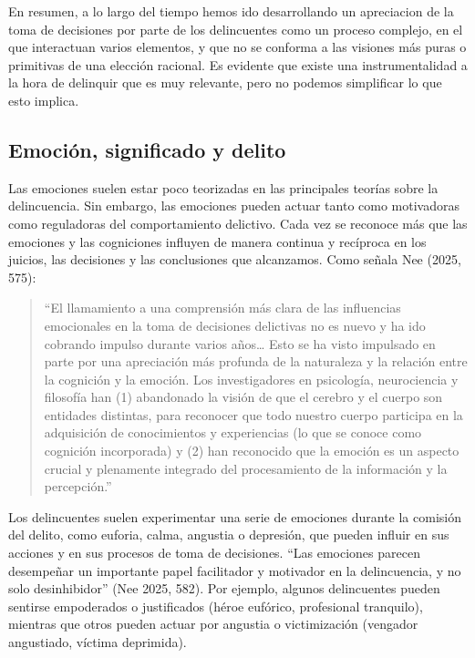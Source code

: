 \documentclass[
  spanish,
  letterpaper,
  DIV=11,
  numbers=noendperiod]{scrreprt}
\begin{document}
En resumen, a lo largo del tiempo hemos ido desarrollando un apreciacion
de la toma de decisiones por parte de los delincuentes como un proceso
complejo, en el que interactuan varios elementos, y que no se conforma a
las visiones más puras o primitivas de una elección racional. Es
evidente que existe una instrumentalidad a la hora de delinquir que es
muy relevante, pero no podemos simplificar lo que esto implica.

\subsection{Emoción, significado y
delito}\label{emociuxf3n-significado-y-delito}

Las emociones suelen estar poco teorizadas en las principales teorías
sobre la delincuencia. Sin embargo, las emociones pueden actuar tanto
como motivadoras como reguladoras del comportamiento delictivo. Cada vez
se reconoce más que las emociones y las cogniciones influyen de manera
continua y recíproca en los juicios, las decisiones y las conclusiones
que alcanzamos. Como señala Nee (2025, 575):

\begin{quote}
``El llamamiento a una comprensión más clara de las influencias
emocionales en la toma de decisiones delictivas no es nuevo y ha ido
cobrando impulso durante varios años\ldots{} Esto se ha visto impulsado
en parte por una apreciación más profunda de la naturaleza y la relación
entre la cognición y la emoción. Los investigadores en psicología,
neurociencia y filosofía han (1) abandonado la visión de que el cerebro
y el cuerpo son entidades distintas, para reconocer que todo nuestro
cuerpo participa en la adquisición de conocimientos y experiencias (lo
que se conoce como cognición incorporada) y (2) han reconocido que la
emoción es un aspecto crucial y plenamente integrado del procesamiento
de la información y la percepción.''
\end{quote}

Los delincuentes suelen experimentar una serie de emociones durante la
comisión del delito, como euforia, calma, angustia o depresión, que
pueden influir en sus acciones y en sus procesos de toma de decisiones.
``Las emociones parecen desempeñar un importante papel facilitador y
motivador en la delincuencia, y no solo desinhibidor'' (Nee 2025, 582).
Por ejemplo, algunos delincuentes pueden sentirse empoderados o
justificados (héroe eufórico, profesional tranquilo), mientras que otros
pueden actuar por angustia o victimización (vengador angustiado, víctima
deprimida).
\end{document}
